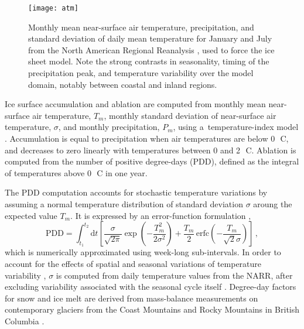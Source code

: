 \documentclass[tc]{copernicus}
\begin{document}
\begin{figure}
  \texttt{[image: atm]}
  \caption{Monthly mean near-surface air temperature, precipitation, and
           standard deviation of daily mean temperature for January and July
           from the North American Regional Reanalysis
           \citep[NARR;][]{Mesinger.etal.2006},
           used to force the ice sheet model. Note the
           strong contrasts in seasonality, timing of the precipitation peak,
           and temperature variability over the model domain, notably between
           coastal and inland regions.}
  \label{fig:atm}
\end{figure}

Ice surface accumulation and ablation are computed from monthly mean
near-surface air temperature, $T_m$, monthly standard deviation of near-surface
air temperature, $\sigma$, and monthly precipitation, $P_m$, using
a~temperature-index model \citep[e.g.,][]{Hock.2003}.
Accumulation is equal to
precipitation when air temperatures are below 0\,\unit{{\degree}C}, and
decreases to zero linearly with temperatures between 0 and
2\,\unit{{\degree}C}. Ablation is computed from the number of positive
degree-days (PDD), defined as the integral of temperatures above
0\,\unit{{\degree}C} in one year.

The PDD computation accounts for stochastic temperature variations by assuming
a normal temperature distribution of standard deviation $\sigma$ aroung the
expected value $T_m$. It is expressed by an error-function formulation
\citep{Calov.Greve.2005},
\begin{equation}
    \label{eqn:calovgreve}
    \mathrm{PDD} = \int_{t_1}^{t_2} \mathrm{d}t
        \left[\frac{\sigma}{\sqrt{2\pi}}
                \exp\left({-\frac{T_{m}^2}{2\sigma^2}}\right)
              + \frac{T_{m}}{2} \, \mathrm{erfc}
                \left(-\frac{T_{m}}{\sqrt{2}\sigma}\right)\right] \,,
\end{equation}
which is numerically approximated using week-long sub-intervals. In order to
account for the effects of spatial and seasonal variations of temperature
variability \citep{Seguinot.2013}, $\sigma$ is computed from daily temperature
values from the NARR, after excluding variability associated with the seasonal
cycle itself \citep[Fig.~\ref{fig:atm}, cf.][]{Seguinot.Rogozhina.2014}.
Degree-day factors for snow and ice melt are derived from
mass-balance measurements on contemporary glaciers from the Coast Mountains and
Rocky Mountains in British Columbia
\citep[Table~\ref{tab:params};][]{Shea.etal.2009}.
\end{document}
